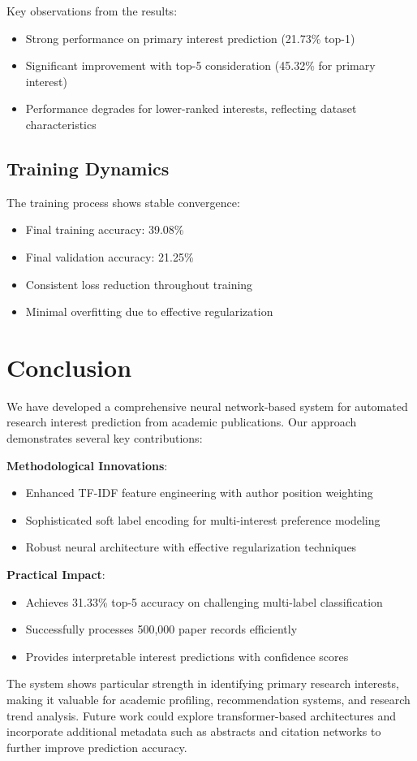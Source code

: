 \documentclass[preprint,12pt]{elsarticle}
\begin{document}
Key observations from the results:
\begin{itemize}
    \item Strong performance on primary interest prediction (21.73\% top-1)
    \item Significant improvement with top-5 consideration (45.32\% for primary interest)
    \item Performance degrades for lower-ranked interests, reflecting dataset characteristics
\end{itemize}

\subsection{Training Dynamics}
The training process shows stable convergence:
\begin{itemize}
    \item Final training accuracy: 39.08\%
    \item Final validation accuracy: 21.25\%
    \item Consistent loss reduction throughout training
    \item Minimal overfitting due to effective regularization
\end{itemize}

\section{Conclusion}
\label{sec5}

We have developed a comprehensive neural network-based system for automated research interest prediction from academic publications. Our approach demonstrates several key contributions:

\textbf{Methodological Innovations}:
\begin{itemize}
    \item Enhanced TF-IDF feature engineering with author position weighting
    \item Sophisticated soft label encoding for multi-interest preference modeling
    \item Robust neural architecture with effective regularization techniques
\end{itemize}

\textbf{Practical Impact}:
\begin{itemize}
    \item Achieves 31.33\% top-5 accuracy on challenging multi-label classification
    \item Successfully processes 500,000 paper records efficiently
    \item Provides interpretable interest predictions with confidence scores
\end{itemize}

The system shows particular strength in identifying primary research interests, making it valuable for academic profiling, recommendation systems, and research trend analysis. Future work could explore transformer-based architectures and incorporate additional metadata such as abstracts and citation networks to further improve prediction accuracy.



\end{document}

